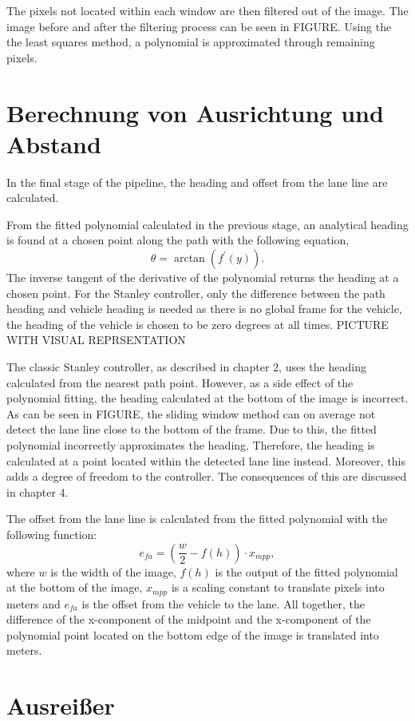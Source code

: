 \documentclass[arbeit=studie,oneside,BCOR=12mm]{ArbeitRST}
\begin{document}
The pixels not located within each window are then filtered out of the image.
The image before and after the filtering process can be seen in FIGURE. Using
the the least squares method, a polynomial is approximated through remaining
pixels.

\section{Berechnung von Ausrichtung und Abstand}
In the final stage of the pipeline, the heading and offset from the lane line
are calculated. 

From the fitted polynomial calculated in the previous stage, an analytical
heading is found at a chosen point along the path with the following equation,
\begin{equation}
  \theta = \arctan(f^\prime(y)).
\end{equation}
The inverse tangent of the derivative of
the polynomial returns the heading at a chosen point. For the Stanley
controller, only the difference between the path heading and vehicle heading
is needed as there is no global frame for the vehicle, the heading
of the vehicle is chosen to be zero degrees at all times. PICTURE WITH VISUAL
REPRSENTATION 

The classic Stanley controller, as described in chapter 2, uses the heading
calculated from the nearest path point. However, as a side effect of the
polynomial fitting, the heading calculated at the bottom of the image is
incorrect. As can be seen in FIGURE, the sliding window method can on average
not detect the lane line close to the bottom of the frame. Due to this, the
fitted polynomial incorrectly approximates the heading. Therefore, the heading
is calculated at a point located within the detected lane line instead.
Moreover, this adds a degree of freedom to the controller. The consequences of
this are discussed in chapter 4.


The offset from the lane line is calculated from the fitted polynomial with
the following function: $$e_{fa} = (\frac{w}{2} - f(h))\cdot x_{mpp},$$ where
$w$ is the width of the image, $f(h)$ is the output of the fitted polynomial
at the bottom of the image, $x_{mpp}$ is a scaling constant to translate
pixels into meters and $e_{fa}$ is the offset from the vehicle to the lane.
All together, the difference of the x-component of the midpoint and the
x-component of the polynomial point located on the bottom edge of the image is
translated into meters.

\section{Ausrei{\ss}er}
\end{document}
